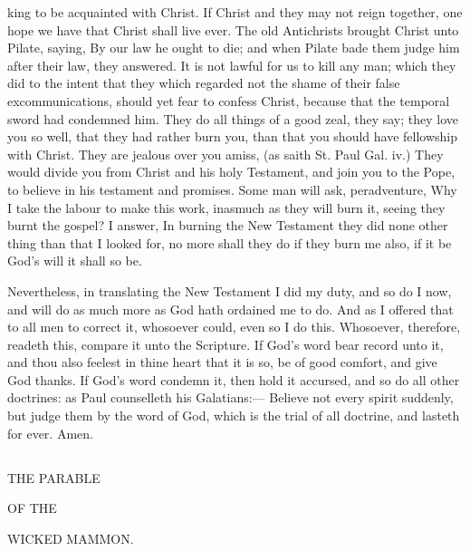 king to be acquainted with Christ. If Christ and 
they may not reign together, one hope we have 
that Christ shall live ever. The old Antichrists 
brought Christ unto Pilate, saying, By our law 
he ought to die; and when Pilate bade them 
judge him after their law, they answered. It is 
not lawful for us to kill any man; which they did 
to the intent that they which regarded not the 
shame of their false excommunications, should 
yet fear to confess Christ, because that the
temporal sword had condemned him. They do all 
things of a good zeal, they say; they love you 
so well, that they had rather burn you, than that 
you should have fellowship with Christ. They 
are jealous over you amiss, (as saith St. Paul 
Gal. iv.) They would divide you from Christ and 
his holy Testament, and join you to the Pope, 
to believe in his testament and promises. Some 
man will ask, peradventure, Why I take the 
labour to make this work, inasmuch as they will 
burn it, seeing they burnt the gospel? I answer, 
In burning the New Testament they did none 
other thing than that I looked for, no more shall 
they do if they burn me also, if it be God's will 
it shall so be. 

Nevertheless, in translating the New Testament 
I did my duty, and so do I now, and will do as 
much more as God hath ordained me to do. And 
as I offered that to all men to correct it,
whosoever could, even so I do this. Whosoever, 
therefore, readeth this, compare it unto the 
Scripture. If God's word bear record unto it, 
and thou also feelest in thine heart that it is so, 
be of good comfort, and give God thanks. If 
God's word condemn it, then hold it accursed, 
and so do all other doctrines: as Paul
counselleth his Galatians:— Believe not every spirit 
suddenly, but judge them by the word of God, 
which is the trial of all doctrine, and lasteth for 
ever. Amen. 

\subsection*{}
\begin{center}
THE PARABLE 

OF THE 

WICKED MAMMON. 
\end{center}

